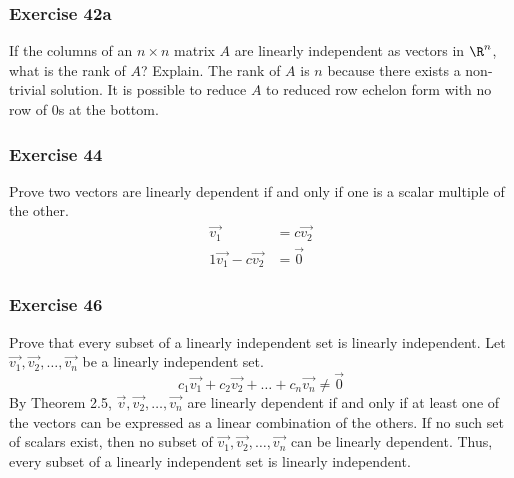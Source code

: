 \documentclass[letterpaper, 12pt]{math}
\begin{document}
\subsubsection*{Exercise 42a}
If the columns of an \( n\times n \) matrix \( A \) are linearly independent
as vectors in \( \R^n \), what is the rank of \( A \)? Explain.
The rank of \( A \) is \( n \) because there exists a non-trivial solution. It
is possible to reduce \( A \) to reduced row echelon form with no row of 0s
at the bottom.

\subsubsection*{Exercise 44}
Prove two vectors are linearly dependent if and only if one is a scalar multiple
of the other.
\begin{align*}
  \vec{v_1} &= c\vec{v_2} \\
  1\vec{v_1}-c\vec{v_2} &= \vec{0}
\end{align*}

\subsubsection*{Exercise 46}
Prove that every subset of a linearly independent set is linearly independent.
Let \( \vec{v_1},\vec{v_2},\dots,\vec{v_n} \) be a linearly independent set.
\[ c_1\vec{v_1}+c_2\vec{v_2}+\dots+c_n\vec{v_n} \ne \vec{0} \]
By Theorem 2.5, \( \vec{v},\vec{v_2},\dots,\vec{v_n} \) are linearly dependent
if and only if at least one of the vectors can be expressed as a linear
combination of the others. If no such set of scalars exist, then no subset
of \( \vec{v_1},\vec{v_2},\dots,\vec{v_n} \) can be linearly dependent. Thus,
every subset of a linearly independent set is linearly independent.
\end{document}
